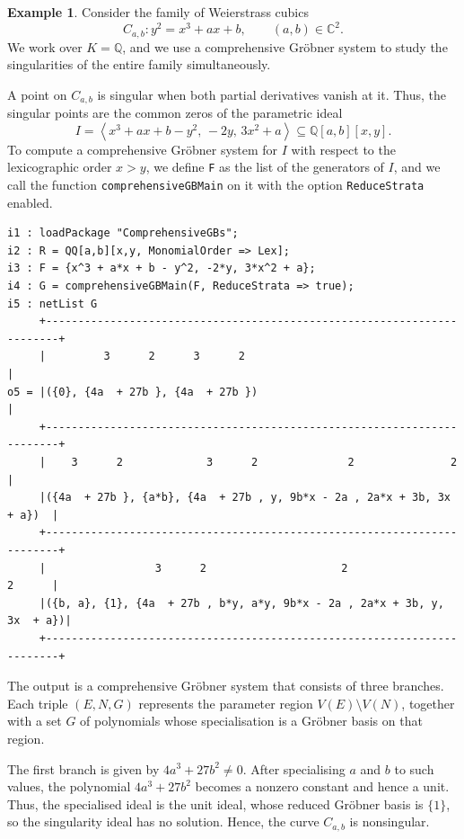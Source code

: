 \documentclass[11pt]{amsart}
\theoremstyle{plain}
\theoremstyle{definition}
\newtheorem{example}[theorem]{Example}
\theoremstyle{remark}
\begin{document}
\begin{example}\label{example:weierstrass}
Consider the family of Weierstrass cubics
\[
C_{a,b}:y^2=x^3+ax+b,
\qquad (a,b)\in\mathbb{C}^2.
\]
We work over $K=\mathbb{Q}$, and we use a comprehensive
Gr\"obner system to study the singularities of the entire family simultaneously.

A point on $C_{a,b}$ is singular when both
partial derivatives vanish at it.
Thus, the singular points are the common zeros of the parametric ideal
\[
I=\left\langle
x^3+ax+b-y^2,\,-2y,\,3x^2+a
\right\rangle
\subseteq\mathbb{Q}[a,b][x,y].
\]
To compute a comprehensive Gr\"obner system for $I$ with
respect to the lexicographic order $x>y$, we define \texttt{F} as the list of the generators of $I$, and we call the function \texttt{comprehensiveGBMain} on it with the option \texttt{ReduceStrata} enabled.

\begin{lstlisting}
i1 : loadPackage "ComprehensiveGBs";
i2 : R = QQ[a,b][x,y, MonomialOrder => Lex];
i3 : F = {x^3 + a*x + b - y^2, -2*y, 3*x^2 + a};
i4 : G = comprehensiveGBMain(F, ReduceStrata => true);
i5 : netList G
     +------------------------------------------------------------------------+
     |         3      2      3      2                                         |
o5 = |({0}, {4a  + 27b }, {4a  + 27b })                                       |
     +------------------------------------------------------------------------+
     |    3      2             3      2              2               2        |
     |({4a  + 27b }, {a*b}, {4a  + 27b , y, 9b*x - 2a , 2a*x + 3b, 3x  + a})  |
     +------------------------------------------------------------------------+
     |                 3      2                     2                  2      |
     |({b, a}, {1}, {4a  + 27b , b*y, a*y, 9b*x - 2a , 2a*x + 3b, y, 3x  + a})|
     +------------------------------------------------------------------------+
\end{lstlisting}

The output is a comprehensive Gröbner system that consists of three branches. Each triple
$(E,N,G)$ represents the parameter region
$V(E)\setminus V(N)$, together with a set $G$ of polynomials whose
specialisation is a Gr\"obner basis on that region.

The first branch is given by $4a^3+27b^2\neq0$. After specialising $a$ and $b$ to such values, the polynomial $4a^3+27b^2$ becomes a nonzero constant and hence a unit. Thus, the specialised ideal is the unit ideal, whose reduced
Gr\"obner basis is $\{1\}$, so the singularity ideal has no solution. Hence, the curve $C_{a,b}$ is nonsingular.


\end{example}
\end{document}

